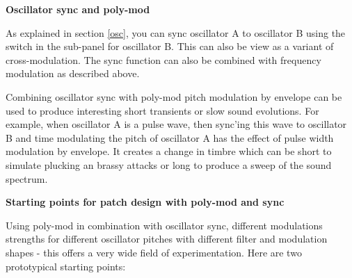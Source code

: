 
\textbf{Oscillator sync and poly-mod}

As explained in section \ref{osc}, you can sync oscillator A to oscillator B using the \oscsync switch in the sub-panel for oscillator B. This can also be view as a variant of cross-modulation. The sync function can also be combined with frequency modulation as described above. 

Combining oscillator sync with poly-mod pitch modulation by envelope can be used to produce interesting short transients or slow sound evolutions. For example, when oscillator A is a pulse wave, then sync'ing this wave to oscillator B and time modulating the pitch of oscillator A has the effect of pulse width modulation by envelope. It creates a change in timbre which can be short to simulate plucking an brassy attacks or long to produce a sweep of the sound spectrum.

\textbf{Starting points for patch design with poly-mod and sync}

Using poly-mod in combination with oscillator sync, different modulations strengths for different oscillator pitches with different filter and modulation shapes - this offers a very wide field of experimentation. Here are two prototypical starting points:

